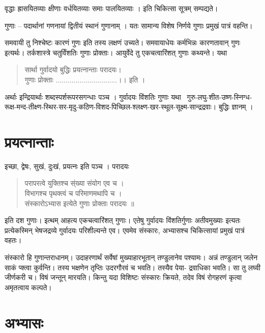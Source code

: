 {वृद्धाः ह्रासयितव्याः क्षीणाः वर्धयितव्याः समाः पालयितव्याः । इति चिकित्सा सूत्रम् सम्पद्यते।

गुणाः – पदार्थानां गणनायां द्वितीयं स्थानं गुणानाम् । यतः सामान्य विशेष निर्णये गुणाः प्रमुखं पात्रं वहन्ति।


समवायी तु निश्चेष्टः कारणं गुणः इति तस्य लक्षणं उच्यते। समवायाधेयः कर्मभिन्नः कारणतावान् गुणः इत्यर्थः। तर्कशास्त्रे चतुर्विंशतिः गुणाः प्रोक्ताः। आयुर्वेदे तु एकचत्वारिंशत् गुणाः कथ्यन्ते। यथा

\begin{verse}
सार्था गुर्वादयो बुद्धिः प्रयत्नान्ताः परादयः।\\
गुणाः प्रोक्ताः ...............................।। इति ।
\end{verse}
अर्थाः इन्द्रियार्थाः शब्दस्पर्शरूपरसगन्धाः पञ्च । गुर्वादयः विंशतिः गुणाः यथा \ गुरु-लघु-शीत-उष्ण-स्निग्ध- रूक्ष-मन्द-तीक्ष्ण-स्थिर-सर-मृदु-कठिण-विशद-पिच्छिल-श्लक्ष्ण-खर-स्थूल-सूक्ष्म-सान्द्रद्रवाः। बुद्धिः ज्ञानम् ।

\section*{प्रयत्नान्ताः}

इच्छा, द्वेषः, सुखं, दुःखं, प्रयत्नः इति पञ्च । परादयः

\begin{verse}
परापरत्वे युक्तिश्च स्ंख्या संयोग एव च ।\\
विभागश्च पृथक्त्वं च परिमाणमथापि च ।\\
संस्कारोऽभ्यास इत्येते गुणाः प्रोक्ताः परादयः ॥
\end{verse}
इति दश गुणाः। इत्थम् आहत्य एकचत्वारिंशत् गुणाः। एतेषु गुर्वादयः विंशतिर्गुणाः अतीवमुख्याः इत्यतः प्रत्येकस्मिन् भेषजद्रव्ये गुर्वादयः परिशील्यन्ते एव। एवमेव संस्कारः, अभ्यासश्च चिकित्सायां प्रमुखं पात्रं वहतः।

संस्कारो हि गुणान्तराधानम्। उदाहरणार्थं सर्वेषां मुख्याहारभूतान् तण्डुलानेव पश्यामः। अन्नं तण्डुलान् जलेन साकं प्क्त्वा कुर्वन्ति। तस्य भक्षणेन तृप्तिः उदरगौरवं च भवति। तस्यैव पेया-  द्रवाधिका भवति। सा तु लघ्वी जीर्णकरी च। विषं जन्तून् मारयति। किन्तु यदा विशिष्टः संस्कारः क्रियते, तदेव विषं रोगहरणं कृत्वा अमृतत्वाय कल्पते।

\section*{अभ्यासः}

}
